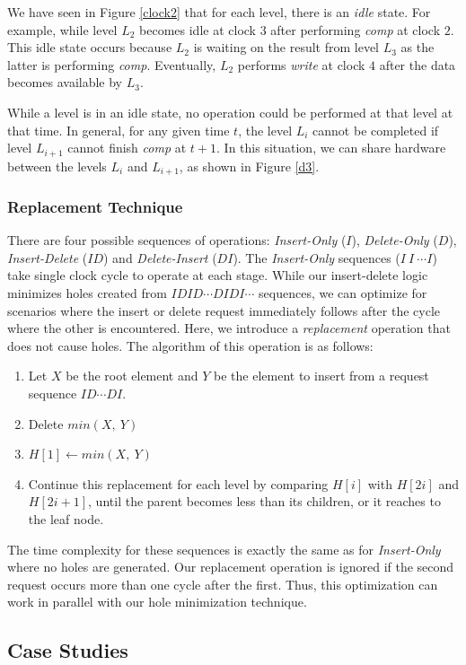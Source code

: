 We have seen in Figure \ref{clock2} that for each level, there is an {\it idle} state.
For example, while level $L_2$ becomes idle at clock $3$ after performing {\it comp} at clock $2$.
This idle state occurs because $L_2$ is waiting on the result from level $L_3$ as the latter is performing {\it comp}.
Eventually, $L_2$ performs {\it write} at clock $4$ after the data becomes available by $L_3$.

While a level is in an idle state, no operation could be performed at that level at that time.
In general, for any given time $t$, the level $L_i$ cannot be completed if level $L_{i+1}$ cannot finish {\it comp} at $t+1$.
In this situation, we can share hardware between the levels $L_i$ and $L_{i+1}$, as shown in Figure \ref{d3}.

\subsubsection{Replacement Technique}
There are four possible sequences of operations: {\it Insert-Only} ($I$), {\it Delete-Only} ($D$), {\it Insert-Delete} ($ID$) and {\it Delete-Insert} ($DI$).
The {\it Insert-Only} sequences ($I \ I \ \cdots I $) take single clock cycle to operate at each stage.
While our insert-delete logic minimizes holes created from $IDID \cdots DIDI \cdots$ sequences, we can optimize for scenarios where the insert or delete request immediately follows after the cycle where the other is encountered.
Here, we introduce a {\it replacement} operation that does not cause holes.
The algorithm of this operation is as follows:
 \begin{enumerate}
 \item Let $X$ be the root element and $Y$ be the element to insert from a request sequence $ID \cdots DI$.
 \item Delete $min(X, \ Y)$
 \item $H[1] \leftarrow min(X,\ Y)$
 \item Continue this replacement for each level by comparing $H[i]$ with $H[2i]$ and $H[2i+1]$, until the parent becomes less than its children, or it reaches to the leaf node.
 \end{enumerate}
The time complexity for these sequences is exactly the same as for {\it Insert-Only} where no holes are generated.
Our replacement operation is ignored if the second request occurs more than one cycle after the first.
Thus, this optimization can work in parallel with our hole minimization technique.


\subsection{Case Studies}
